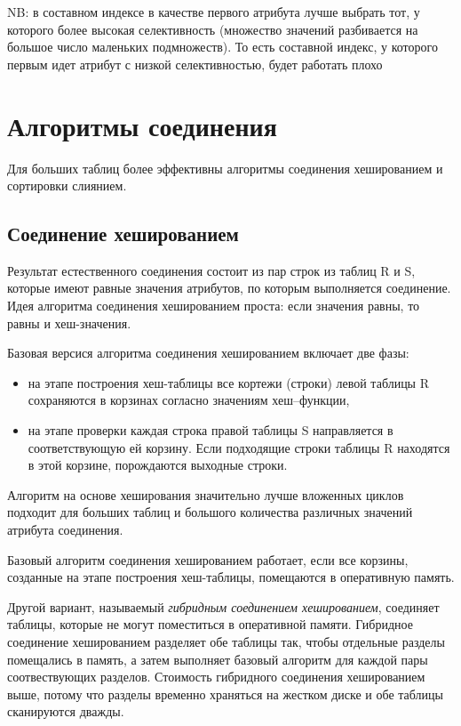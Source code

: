 \documentclass[%
	11pt,
	a4paper,
	utf8,
		]{article}
\begin{document}
NB: в составном индексе в качестве первого атрибута лучше выбрать тот, у которого более высокая селективность (множество значений разбивается на большое число маленьких подмножеств). То есть составной индекс, у которого первым идет атрибут с низкой селективностью, будет работать плохо



\section{Алгоритмы соединения}

Для больших таблиц более эффективны алгоритмы соединения хешированием и сортировки слиянием.

\subsection{Соединение хешированием}

Результат естественного соединения состоит из пар строк из таблиц R и S, которые имеют равные значения атрибутов, по которым выполняется соединение. Идея алгоритма соединения хешированием проста: если значения равны, то равны и хеш-значения.

Базовая версися алгоритма соединения хешированием включает две фазы:
\begin{itemize}
	\item на этапе построения хеш-таблицы все кортежи (строки) левой таблицы R сохраняются в корзинах согласно значениям хеш--функции,
	
	\item на этапе проверки каждая строка правой таблицы S направляется в соответствующую ей корзину. Если подходящие строки таблицы R находятся в этой корзине, порождаются выходные строки.
\end{itemize}

Алгоритм на основе хеширования значительно лучше вложенных циклов подходит для больших таблиц и большого количества различных значений атрибута соединения.

Базовый алгоритм соединения хешированием работает, если все корзины, созданные на этапе построения хеш-таблицы, помещаются в оперативную память. 

Другой вариант, называемый \emph{гибридным соединением хешированием}, соединяет таблицы, которые не могут поместиться в оперативной памяти. Гибридное соединение хешированием разделяет обе таблицы так, чтобы отдельные разделы помещались в память, а затем выполняет базовый алгоритм для каждой пары соотвествующих разделов. Стоимость гибридного соединения хешированием выше, потому что разделы временно храняться на жестком диске и обе таблицы сканируются дважды.
\end{document}
